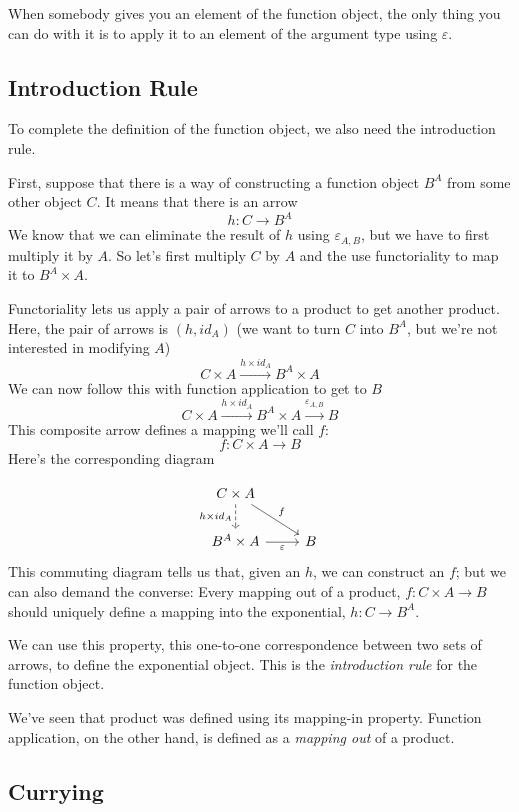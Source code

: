\documentclass[DaoFP]{subfiles}
\begin{document}
When somebody gives you an element of the function object, the only thing you can do with it is to apply it to an element of the argument type using $\varepsilon$. 

\subsection{Introduction Rule}
To complete the definition of the function object, we also need the introduction rule. 

First, suppose that there is a way of constructing a function object $B^A$ from some other object $C$. It means that there is an arrow
\[h \colon C \to B^A\]
We know that we can eliminate the result of $h$ using $\varepsilon_{A, B}$, but we have to first multiply it by $A$. So let's first multiply $C$ by $A$ and the use functoriality to map it to $B^A \times A$. 

Functoriality lets us apply a pair of arrows to a product to get another product. Here, the pair of arrows is $(h, id_A)$ (we want to turn $C$ into $B^A$, but we're not interested in modifying $A$)
\[ C \times A \xrightarrow{h \times id_A} B^A \times A \]
We can now follow this with function application to get to $B$
\[ C \times A \xrightarrow{h \times id_A} B^A \times A \xrightarrow{\varepsilon_{A, B}} B\]
This composite arrow defines a mapping we'll call $f$:
\[f \colon C \times A \to B\]
Here's the corresponding diagram

\[
 \begin{tikzcd}
 C \times A
 \arrow[d, dashed, "h \times id_A"']
 \arrow[rd, "f"]
 \\
 B^A \times A
 \arrow[r, "\varepsilon"']
& B
 \end{tikzcd}
\]
This commuting diagram tells us that, given an $h$, we can construct an $f$; but we can also demand the converse: Every mapping out of a product, $f \colon C \times A \to B$ should uniquely define a mapping into the exponential, $h \colon C \to B^A$. 

We can use this property, this one-to-one correspondence between two sets of arrows, to define the exponential object. This is the \emph{introduction rule} for the function object. 

We've seen that product was defined using its mapping-in property. Function application, on the other hand, is defined as a \emph{mapping out} of a product. 

\subsection{Currying}
\end{document}
